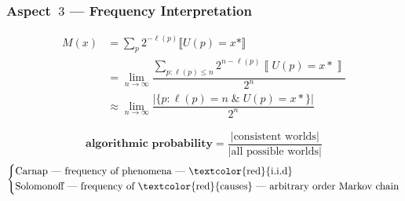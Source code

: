 \documentclass[UTF8,11pt,colorlinks,compress,openany]{beamer}%
\begin{document}
\begin{frame}\frametitle{Aspect~$3$ --- Frequency Interpretation}
	\begin{align*}
	M(x)&=\sum_{p}2^{-\ell(p)}\llbracket U(p)=x*\rrbracket\\
	&=\lim\limits_{n\to\infty}\dfrac{\sum\limits_{p:\ell(p)\leq n}2^{n-\ell(p)}\left\llbracket U(p)=x*\right\rrbracket}{2^n}\\
	&\approx\lim\limits_{n\to\infty}\dfrac{\big|\big\{p:\ell(p)=n\;\&\; U(p)=x*\big\}\big|}{2^n}
	\end{align*}
	
	\begin{block}{}
		\[\textbf{algorithmic probability}=\dfrac{\big|\text{consistent worlds}\big|}{\big|\text{all possible worlds}\big|}\]
		\[\left\lbrace\begin{aligned}
		&\text{Carnap --- frequency of phenomena --- \textcolor{red}{i.i.d}}\\
		&\text{Solomonoff --- frequency of \textcolor{red}{causes} --- arbitrary order Markov chain}
		\end{aligned}\right.\]
	\end{block}
\end{frame}
\end{document}
